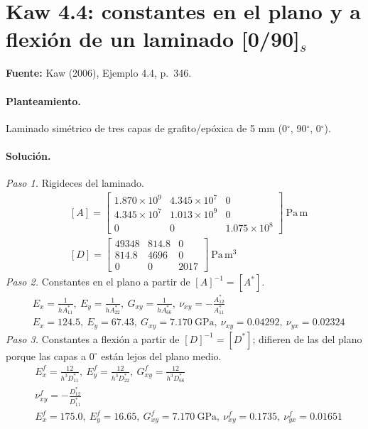 \documentclass[11pt]{article}
\begin{document}
\clearpage
\section{Kaw 4.4: constantes en el plano y a flexión de un laminado [0/90]$_s$}\label{ej:kaw_4_4}
\textbf{Fuente:} Kaw (2006), Ejemplo 4.4, p.~346.

\paragraph{Planteamiento.} Laminado simétrico de tres capas de grafito/epóxica de 5 mm (0\ensuremath{^\circ}, 90\ensuremath{^\circ}, 0\ensuremath{^\circ}).

\paragraph{Solución.}
\textit{Paso 1.} Rigideces del laminado.
\begin{align*}
&[A]=\begin{bmatrix}1.870\times10^{9} & 4.345\times10^{7} & 0 \\ 4.345\times10^{7} & 1.013\times10^{9} & 0 \\ 0 & 0 & 1.075\times10^{8}\end{bmatrix}\ \mathrm{Pa\,m} \\
&[D]=\begin{bmatrix}49348 & 814.8 & 0 \\ 814.8 & 4696 & 0 \\ 0 & 0 & 2017\end{bmatrix}\ \mathrm{Pa\,m^3}
\end{align*}
\textit{Paso 2.} Constantes en el plano a partir de $[A]^{-1}=[A^*]$.
\begin{align*}
&E_x=\frac{1}{hA^*_{11}},\ E_y=\frac{1}{hA^*_{22}},\ G_{xy}=\frac{1}{hA^*_{66}},\ \nu_{xy}=-\frac{A^*_{12}}{A^*_{11}} \\
&E_x=124.5,\ E_y=67.43,\ G_{xy}=7.170\ \mathrm{GPa},\ \nu_{xy}=0.04292,\ \nu_{yx}=0.02324
\end{align*}
\textit{Paso 3.} Constantes a flexión a partir de $[D]^{-1}=[D^*]$; difieren de las del plano porque las capas a 0\ensuremath{^\circ} están lejos del plano medio.
\begin{align*}
&E^f_x=\frac{12}{h^3D^*_{11}},\ E^f_y=\frac{12}{h^3D^*_{22}},\ G^f_{xy}=\frac{12}{h^3D^*_{66}} \\
&\nu^f_{xy}=-\frac{D^*_{12}}{D^*_{11}} \\
&E^f_x=175.0,\ E^f_y=16.65,\ G^f_{xy}=7.170\ \mathrm{GPa},\ \nu^f_{xy}=0.1735,\ \nu^f_{yx}=0.01651
\end{align*}
\end{document}
